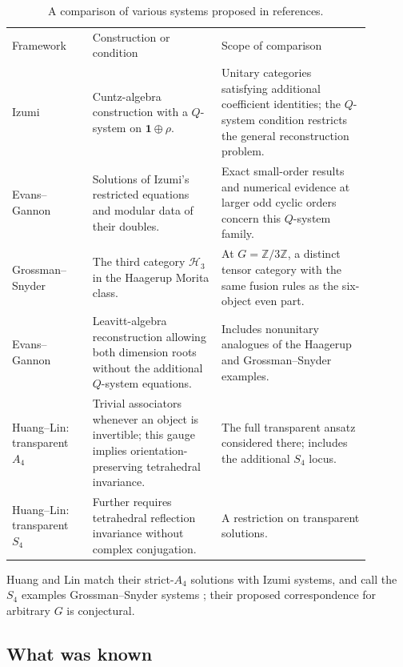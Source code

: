 \documentclass[11pt]{article}
\numberwithin{equation}{section}
\theoremstyle{definition}
\theoremstyle{remark}
\newcommand{\Z}{\mathbb Z}
\newcommand{\one}{\mathbf1}
\begin{document}
\begin{table}[htbp]
\centering
\small
\setlength{\tabcolsep}{4pt}
\begin{tabular}{|p{0.20\linewidth}|p{0.32\linewidth}|p{0.37\linewidth}|}
\hline
Framework & Construction or condition & Scope of comparison\\
\hhline{|=|=|=|}
Izumi \cite{Izumi2}
& Cuntz-algebra construction with a $Q$-system on $\one\oplus\rho$.
& Unitary categories satisfying additional coefficient identities;
  the $Q$-system condition restricts the general reconstruction problem.\\
\hline
Evans--Gannon \cite{EG2011}
& Solutions of Izumi's restricted equations and modular data of their doubles.
& Exact small-order results and numerical evidence at larger odd cyclic
  orders concern this $Q$-system family.\\
\hline
\raggedright Grossman--Snyder \cite{GS}
& \raggedright The third category $\mathcal H_3$ in the Haagerup Morita class.
& At $G=\Z/3\Z$, a distinct tensor category with the same fusion
  rules as the six-object even part.\\
\hline
Evans--Gannon \cite{EG}
& Leavitt-algebra reconstruction allowing both dimension roots without
  the additional $Q$-system equations.
& Includes nonunitary analogues of the Haagerup and Grossman--Snyder
  examples.\\
\hline
Huang--Lin: transparent $A_4$ \cite{HL}
& Trivial associators whenever an object is invertible; this gauge
  implies orientation-preserving tetrahedral invariance.
& The full transparent ansatz considered there; includes the
  additional $S_4$ locus.\\
\hline
Huang--Lin: transparent $S_4$ \cite{HL}
& Further requires tetrahedral reflection invariance without complex
  conjugation.
& A restriction on transparent solutions.\\
\hline
\end{tabular}
\caption{A comparison of various systems proposed in references.}
\end{table}
Huang and Lin match their strict-$A_4$ solutions with Izumi systems,
and call the $S_4$ examples Grossman--Snyder systems
\cite[Section~6]{HL}; their proposed correspondence for arbitrary $G$
is conjectural.

\subsection*{What was known}
\end{document}
